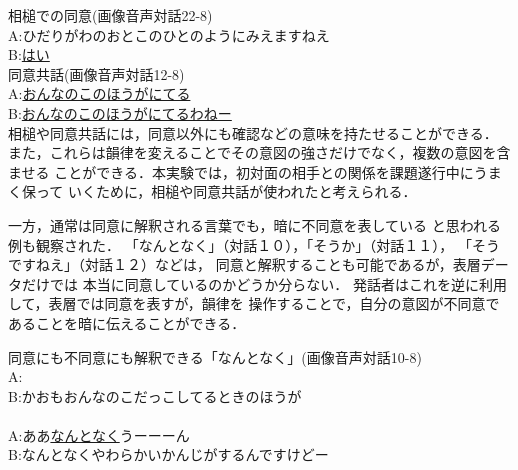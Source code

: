 \hspace*{-0.5cm}{\bf 対話８}\hspace{0.33cm}相槌での同意(画像音声対話22-8)\\
A:ひだりがわのおとこのひとのようにみえますねえ\\
B:\hspace{7.4cm}\underline{はい}\\

\hspace*{-0.5cm}{\bf 対話９}\hspace{0.33cm}同意共話(画像音声対話12-8)\\
A:\hspace{1.65cm}\underline{おんなのこのほうがにてる}\\
B:\underline{おんなのこのほうがにてるわねー}\\

相槌や同意共話には，同意以外にも確認などの意味を持たせることができる．
また，これらは韻律を変えることでその意図の強さだけでなく，複数の意図を含ませる
ことができる．本実験では，初対面の相手との関係を課題遂行中にうまく保って
いくために，相槌や同意共話が使われたと考えられる．

一方，通常は同意に解釈される言葉でも，暗に不同意を表している
と思われる例も観察された．
「なんとなく」（対話１０），「そうか」（対話１１），
「そうですねえ」（対話１２）などは，
同意と解釈することも可能であるが，表層データだけでは
本当に同意しているのかどうか分らない．
発話者はこれを逆に利用して，表層では同意を表すが，韻律を
操作することで，自分の意図が不同意であることを暗に伝えることができる．

\hspace*{-0.5cm}{\bf 対話１０}\hspace{0.33cm}同意にも不同意にも解釈できる「なんとなく」(画像音声対話10-8)\\
A:\\
B:かおもおんなのこだっこしてるときのほうが\\
\vspace{-0.3cm}\\
A:ああ\hspace{0.17cm}\underline{なんとなく}\hspace{0.83cm}うーーーん\\
B:\hspace{1.66cm}なんとなくやわらかいかんじがするんですけどー\\

